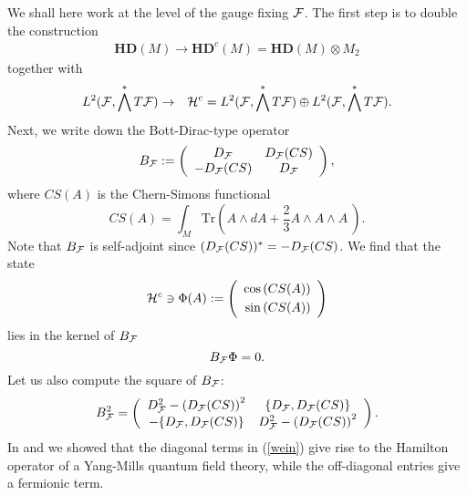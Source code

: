 \documentclass[letterpaper,11pt]{article}
\newcommand{\nn}{\nonumber}
\def\cf{{\cal F}}
\def\ch{{\cal H}}
\begin{document}
We shall here work at the level of the gauge fixing $\cf$.  The first step is to double the construction
\begin{eqnarray}
\mathbf{HD}(M) \longrightarrow \mathbf{HD}^c(M) =  \mathbf{HD}(M)\otimes M_2
\label{HDC}
\end{eqnarray}
together with
\begin{eqnarray}
L^2(\cf,\bigwedge^* T\cf) &\rightarrow& 
\ch^c =
L^2(\cf,\bigwedge^* T\cf) \oplus L^2(\cf,\bigwedge^* T\cf)\nn.
\end{eqnarray}
Next, we write down the Bott-Dirac-type operator
\begin{eqnarray}
B_\cf :=   \left(
\begin{array}{cc}
 D_\cf  &  D_\cf(CS)  \\ 
 -D_\cf(CS)   &  D_\cf
\end{array}
\right),
\label{BDx2}
\end{eqnarray}
where $CS(A)$ is the Chern-Simons functional
\begin{equation}
CS(A) =  \int_M \mbox{Tr} \left( {A}\wedge d{A} + \frac{2}{3} {A}\wedge {A} \wedge {A}\  \right).
\label{CS}
\end{equation}
Note that $B_\cf$ is self-adjoint since $(D_\cf(CS))^*=-D_\cf(CS)$. We find that the state  
\begin{equation}
\ch^c \ni \Phi (A) := \left(
\begin{array}{r}
\cos \left(   CS(A)\right)   
\vspace{0,1cm}
\\
 \sin\left(  CS(A)\right)   
\end{array}
\right) 
\label{platter}
\end{equation}
lies in the kernel of $B_\cf$
$$
B_\cf \Phi =0.
$$
Let us also compute the square of $B_\cf$:
\begin{equation}
B_\cf^2 =
\left(
\begin{array}{cc}
D_\cf^2 - \left(D_\cf(CS)\right)^2  & \{D_\cf, D_\cf(CS)\}
\\
-\{D_\cf, D_\cf(CS)\} & D_\cf^2 - \left(D_\cf(CS)\right)^2
\end{array}
\right).
\label{wein}
\end{equation}
In \cite{Aastrup:2019yui} and \cite{Aastrup:2020jcf} we showed that the diagonal terms in (\ref{wein}) give rise to the Hamilton operator of a Yang-Mills quantum field theory, while the off-diagonal entries give a fermionic term.
\end{document}
